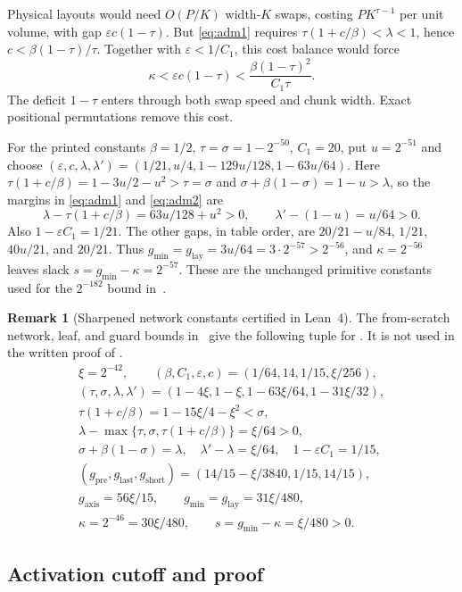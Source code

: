 \documentclass[11pt]{article}
\theoremstyle{definition}
\newtheorem{remark}[theorem]{Remark}
\renewcommand{\label}[1]{}%
\newcommand{\eps}{\varepsilon}
\begin{document}
Physical layouts would need $O(P/K)$ width-$K$ swaps, costing $PK^{\tau-1}$ per unit volume, with gap $\eps c(1-\tau)$.
But \eqref{eq:adm1} requires $\tau(1+c/\beta)<\lambda<1$, hence $c<\beta(1-\tau)/\tau$.
Together with $\eps<1/C_1$, this cost balance would force
\[
 \kappa<\eps c(1-\tau)<\frac{\beta(1-\tau)^2}{C_1\tau}.
\]
The deficit $1-\tau$ enters through both swap speed and chunk width.
Exact positional permutations remove this cost.

For the printed constants $\beta=1/2$, $\tau=\sigma=1-2^{-50}$, $C_1=20$,
put $u=2^{-51}$ and choose
$(\eps,c,\lambda,\lambda')=(1/21,u/4,1-129u/128,1-63u/64)$.
Here $\tau(1+c/\beta)=1-3u/2-u^2>\tau=\sigma$ and
$\sigma+\beta(1-\sigma)=1-u>\lambda$, so the margins in
\eqref{eq:adm1} and \eqref{eq:adm2} are
\[
 \lambda-\tau(1+c/\beta)=63u/128+u^2>0,\qquad
 \lambda'-(1-u)=u/64>0.
\]
Also $1-\eps C_1=1/21$.
The other gaps, in table order, are $20/21-u/84$, $1/21$, $40u/21$, and $20/21$.
Thus $g_{\min}=g_{\mathrm{lay}}=3u/64=3\cdot2^{-57}>2^{-56}$,
and $\kappa=2^{-56}$ leaves slack $s=g_{\min}-\kappa=2^{-57}$.
These are the unchanged primitive constants used for the $2^{-182}$ bound in~\cite{OAI26}.

\begin{remark}[Sharpened network constants certified in Lean~4]\label{rem:lean-tuple}
The from-scratch network, leaf, and guard bounds in~\cite{Lean26} give the following tuple for .
It is not used in the written proof of .
\[
\begin{gathered}
 \xi=2^{-42},\qquad(\beta,C_1,\eps,c)=(1/64,14,1/15,\xi/256),\\
 (\tau,\sigma,\lambda,\lambda')=(1-4\xi,1-\xi,1-63\xi/64,1-31\xi/32),\\
 \tau(1+c/\beta)=1-15\xi/4-\xi^2<\sigma,\\
 \lambda-\max\{\tau,\sigma,\tau(1+c/\beta)\}=\xi/64>0,\\
 \sigma+\beta(1-\sigma)=\lambda,\quad
 \lambda'-\lambda=\xi/64,\quad 1-\eps C_1=1/15,\\
 (g_{\mathrm{pre}},g_{\mathrm{last}},g_{\mathrm{short}})
       =(14/15-\xi/3840,1/15,14/15),\\
 g_{\mathrm{axis}}=56\xi/15,\qquad g_{\min}=g_{\mathrm{lay}}=31\xi/480,\\
 \kappa=2^{-46}=30\xi/480,\qquad s=g_{\min}-\kappa=\xi/480>0.
\end{gathered}
\]
\end{remark}

\subsection{Activation cutoff and proof}\label{sec:mult-proof}
\end{document}
